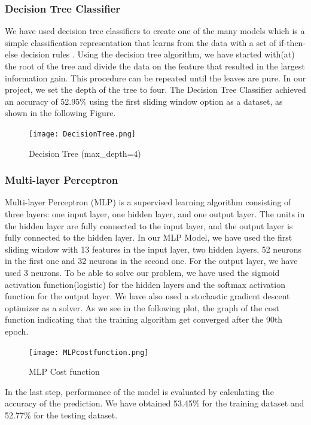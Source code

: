\subsubsection{Decision Tree Classifier}

We have used decision tree classifiers to create one of the many models which is a simple classification representation that learns from the data with a set of if-then-else decision rules \cite{DecisionTree: scikit-learn}. \newline 
Using the decision tree algorithm, we have started with(at) the root of the tree and divide the data on the feature that resulted in the largest information gain. This procedure can be repeated until the leaves are pure.\newline \newline
In our project, we set the depth of the tree to four.\newline
The Decision Tree Classifier achieved an accuracy of 52.95\% using the first sliding window option as a dataset, as shown in the following Figure.
\begin{figure}[H]
\begin{center}
\texttt{[image: DecisionTree.png]}
\end{center}
\caption{Decision Tree (max\_depth=4)}
\label{fig:DecisionTree}
\end{figure}


\subsubsection{Multi-layer Perceptron}

Multi-layer Perceptron (MLP) is a supervised learning algorithm consisting of three layers: one input layer, one hidden layer, and one output layer. The units in the hidden layer are fully connected to the input layer, and the output layer is fully connected to the hidden layer\cite{PythonMachineLearning}. \newline
In our MLP Model, we have used the first sliding window with 13 features in the input layer, two hidden layers, 52 neurons in the first one and 32 neurons in the second one. For the output layer, we have used 3 neurons.\newline \newline 
To be able to solve our problem, we have used the sigmoid activation function(logistic) for the hidden layers and the softmax activation function for the output layer. We have also used a stochastic gradient descent optimizer as a solver. \newline 
As we see in the following plot, the graph of the cost function indicating that the training algorithm get converged after the 90th epoch. \newline
\begin{figure}[H]
\begin{center}
\texttt{[image: MLPcostfunction.png]}
\end{center}
\caption{MLP Cost function}
\label{fig:MLPcostfunction}
\end{figure}
In the last step, performance of the model is evaluated by calculating the accuracy of the prediction. We have obtained 53.45\% for the training dataset and 52.77\% for the testing dataset.

